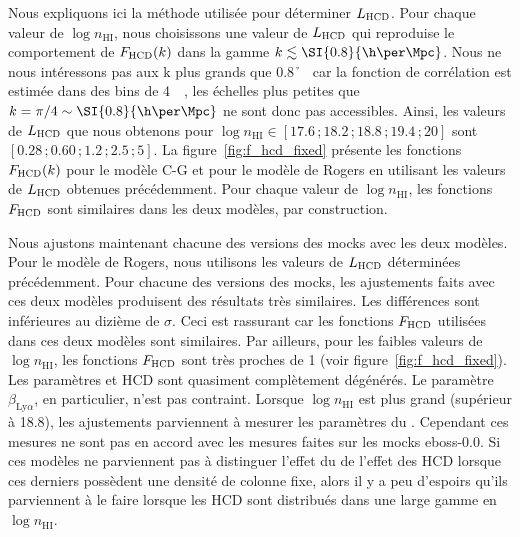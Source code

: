 Nous expliquons ici la méthode utilisée pour déterminer $L_{\textsc{HCD}}$.
Pour chaque valeur de $\log n_{\mathrm{HI}}$, nous choisissons une valeur de $L_{\textsc{HCD}}$ qui reproduise le comportement de $F_{\textsc{HCD}}(k)$ dans la gamme $k \lesssim \SI{0.8}{\h\per\Mpc}$. %
Nous ne nous intéressons pas aux k plus grands que \SI{0.8}{\h\per\Mpc} car la fonction de corrélation est estimée dans des bins de \SI{4}{\perh\Mpc}, les échelles plus petites que $k = \pi / 4 \sim \SI{0.8}{\h\per\Mpc}$ ne sont donc pas accessibles.
Ainsi, les valeurs de $L_{\textsc{HCD}}$ que nous obtenons pour $\log n_{\mathrm{HI}} \in [\num{17.6}\,;\num{18.2}\,;\num{18.8}\,;\num{19.4}\,;\num{20}]$ sont $[\num{0.28}\,; \num{0.60}\,; \num{1.2}\,; \num{2.5}\,; \num{5}]$.
La figure~\ref{fig:f_hcd_fixed} présente les fonctions $F_{\textsc{HCD}}(k)$ pour le modèle C-G et pour le modèle de Rogers en utilisant les valeurs de $L_{\textsc{HCD}}$ obtenues précédemment.
Pour chaque valeur de $\log n_{\mathrm{HI}}$, les fonctions $F_{\textsc{HCD}}$ sont similaires dans les deux modèles, par construction.

Nous ajustons maintenant chacune des versions des mocks avec les deux modèles. Pour le modèle de Rogers, nous utilisons les valeurs de $L_{\textsc{HCD}}$ déterminées précédemment. Pour chacune des versions des mocks, les ajustements faits avec ces deux modèles produisent des résultats très similaires. Les différences sont inférieures au dizième de $\sigma$.
Ceci est rassurant car les fonctions $F_{\textsc{HCD}}$ utilisées dans ces deux modèles sont similaires.
Par ailleurs, pour les faibles valeurs de $\log n_{\mathrm{HI}}$, les fonctions $F_{\textsc{HCD}}$ sont très proches de 1 (voir figure~\ref{fig:f_hcd_fixed}). Les paramètres \lya{} et HCD sont quasiment complètement dégénérés. Le paramètre $\beta_{\mathrm{Ly}\alpha}$, en particulier, n'est pas contraint.  Lorsque $\log n_{\mathrm{HI}}$ est plus grand (supérieur à \num{18.8}), les ajustements parviennent à mesurer les paramètres du \lya{}.
Cependant ces mesures ne sont pas en accord avec les mesures faites sur les mocks eboss-0.0.
Si ces modèles ne parviennent pas à distinguer l'effet du \lya{} de l'effet des HCD lorsque ces derniers possèdent une densité de colonne fixe, alors il y a peu d'espoirs qu'ils parviennent à le faire lorsque les HCD sont distribués dans une large gamme en $\log n_{\mathrm{HI}}$.

